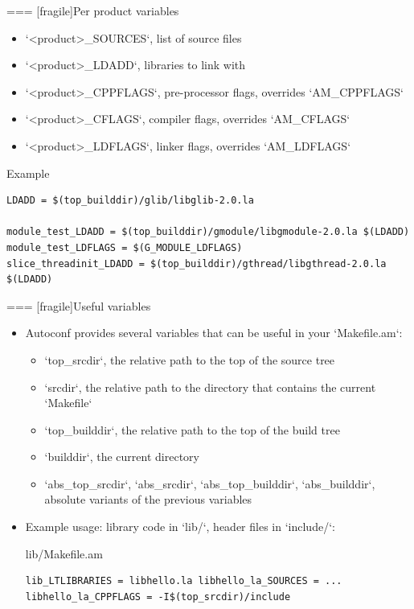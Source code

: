 === [fragile]{Per product variables}
  \begin{itemize}
  \item `<product>_SOURCES`, list of source files
  \item `<product>_LDADD`, libraries to link with
  \item `<product>_CPPFLAGS`, pre-processor flags, overrides `AM_CPPFLAGS`
  \item `<product>_CFLAGS`, compiler flags, overrides `AM_CFLAGS`
  \item `<product>_LDFLAGS`, linker flags, overrides `AM_LDFLAGS`
  \end{itemize}

  \begin{block}{Example}
\begin{verbatim}
LDADD = $(top_builddir)/glib/libglib-2.0.la

module_test_LDADD = $(top_builddir)/gmodule/libgmodule-2.0.la $(LDADD)
module_test_LDFLAGS = $(G_MODULE_LDFLAGS)
slice_threadinit_LDADD = $(top_builddir)/gthread/libgthread-2.0.la $(LDADD)
\end{verbatim}
  \end{block}


=== [fragile]{Useful variables}

  \begin{itemize}

  \item Autoconf provides several variables that can be useful in your
    `Makefile.am`:

    \begin{itemize}

    \item `top_srcdir`, the relative path to the top of the source tree
    \item `srcdir`, the relative path to the directory that contains the current `Makefile`
    \item `top_builddir`, the relative path to the top of the build tree
    \item `builddir`, the current directory
    \item `abs_top_srcdir`, `abs_srcdir`,
      `abs_top_builddir`, `abs_builddir`, absolute variants
      of the previous variables
    \end{itemize}

  \item Example usage: library code in `lib/`, header files in
    `include/`:
    \begin{block}{lib/Makefile.am}
    \begin{verbatim}
lib_LTLIBRARIES = libhello.la libhello_la_SOURCES = ...
libhello_la_CPPFLAGS = -I$(top_srcdir)/include
\end{verbatim}
\end{block}

  \end{itemize}



